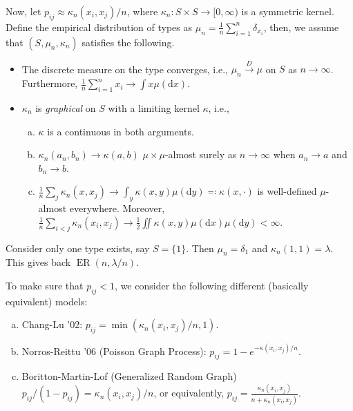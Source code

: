 Now, let \(p_{ij} \approx \kappa _n(x_i, x_j) / n\), where \(\kappa _n \colon S \times S \to [0, \infty )\) is a symmetric kernel. Define the empirical distribution of types as \(\mu _n = \frac{1}{n} \sum_{i=1}^{n} \delta _{x_i} \), then, we assume that \((S, \mu _n, \kappa _n)\) satisfies the following.
\begin{itemize}
	\item The discrete measure on the type converges, i.e., \(\mu _n \overset{D}{\to} \mu \) on \(S\) as \(n \to \infty \). Furthermore, \(\frac{1}{n} \sum_{i=1}^{n} x_i \to \int x \mu (\mathrm{d} x)\).
	\item \(\kappa _n\) is \emph{graphical} on \(S\) with a limiting kernel \(\kappa \), i.e.,
	      \begin{enumerate}[(a)]
		      \item \(\kappa \) is a continuous in both arguments.
		      \item \(\kappa _n(a_n, b_n) \to \kappa (a, b)\) \(\mu \times \mu \)-almost surely as \(n \to \infty \) when \(a_n \to a\) and \(b_n \to b\).
		      \item \(\frac{1}{n} \sum_{j} \kappa _n(x, x_j) \to \int _y \kappa (x, y) \mu (\mathrm{d} y) \eqqcolon \kappa (x, \cdot ) \) is well-defined \(\mu \)-almost everywhere. Moreover, \(\frac{1}{n} \sum_{i < j} \kappa _n(x_i, x_j) \to \frac{1}{2} \iint \kappa (x, y) \mu (\mathrm{d} x) \mu (\mathrm{d} y) < \infty \).
	      \end{enumerate}
\end{itemize}

\begin{eg}
	Consider only one type exists, say \(S = \{ 1 \} \). Then \(\mu _n = \delta _1\) and \(\kappa _n(1, 1) = \lambda \). This gives back \(\operatorname{ER}(n, \lambda / n) \).
\end{eg}

To make sure that \(p_{ij} < 1\), we consider the following different (basically equivalent) models:
\begin{enumerate}[(a)]
	\item Chang-Lu '02: \(p_{ij} = \min (\kappa _n(x_i, x_j) / n , 1)\).
	\item Norros-Reittu '06 (Poisson Graph Process): \(p_{ij} = 1 - e^{- \kappa (x_i, x_j) / n}\).
	\item Boritton-Martin-Lof (Generalized Random Graph) \(p_{ij} / (1 - p_{ij}) = \kappa _n(x_i, x_j) / n\), or equivalently, \(p_{ij} = \frac{\kappa _n(x_i, x_j)}{n + \kappa _n(x_i, x_j)}\).
\end{enumerate}

